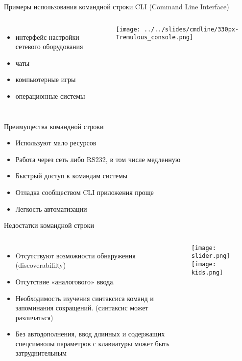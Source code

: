 
\begin{frame}{Примеры использования командной строки}
        CLI (Command Line Interface)
        \pause
	\begin{columns}
        \begin{itemize}
            \item интерфейс настройки сетевого оборудования
            \item чаты
            \item компьютерные игры
            \item операционные системы
        \end{itemize}
    \texttt{[image: ../../slides/cmdline/330px-Tremulous\_console.png]}
	\end{columns}
\end{frame}

\begin{frame}{Преимущества командной строки}
	\begin{itemize}
                \item Используют мало ресурсов
		\item Работа через сеть либо RS232, в том числе медленную
		\item Быстрый доступ к командам системы
		\item Отладка сообществом CLI приложения проще
		\item Легкость автоматизации
	\end{itemize}
\end{frame}

\begin{frame}{Недостатки командной строки}
    \begin{columns}
            \begin{itemize}
                    \item Oтсутствуют возможности обнаружения (discoverabililty)
                    \item Отсутствие «аналогового» ввода.
                    \item Необходимость изучения синтаксиса команд и запоминания сокращений.  (синтаксис может различаться)
                    \item Без автодополнения, ввод длинных и содержащих спецсимволы параметров с клавиатуры может быть затруднительным
            \end{itemize}
            \center\texttt{[image: slider.png]}
            \center\texttt{[image: kids.png]}
    \end{columns}
\end{frame}

